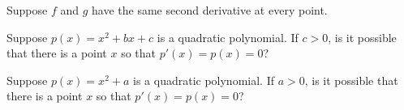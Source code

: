 \documentclass{ximera}
\newcommand{\recommendation}[1]{}
\begin{document}
\begin{shuffle}


\begin{problem}
  Suppose $f$ and $g$ have the same second derivative at every point.  
  \begin{multipleChoice}
  \end{multipleChoice}
\end{problem}



\begin{problem}
  Suppose $p(x) = x^2 + bx + c$ is a quadratic polynomial.  If $c > 0$, is it possible that there is a point $x$ so that $p'(x) = p(x) = 0$?
  \begin{multipleChoice}
  \end{multipleChoice}
\end{problem}

\begin{problem}
  Suppose $p(x) = x^2 + a$ is a quadratic polynomial.  If $a > 0$, is it possible that there is a point $x$ so that $p'(x) = p(x) = 0$?
  \begin{multipleChoice}
  \end{multipleChoice}
\end{problem}

\begin{problem}
  \recommendation{Vic}


\end{problem}
\end{shuffle}
\end{document}
